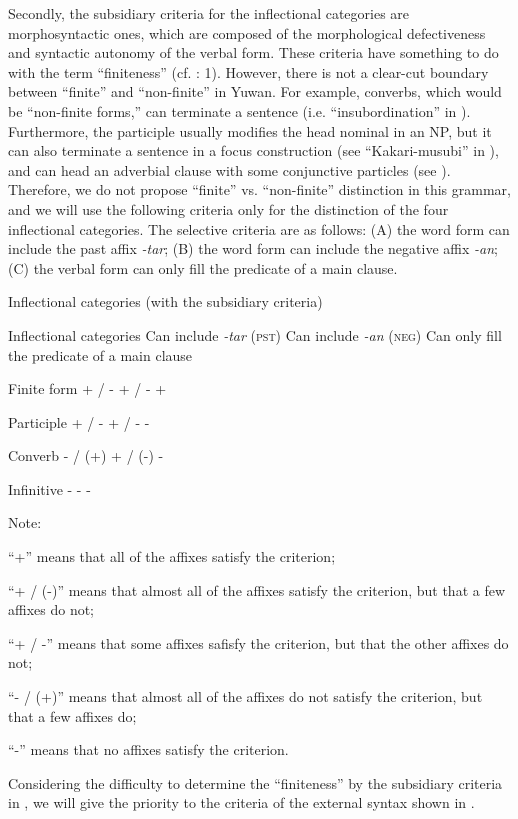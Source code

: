   Secondly, the subsidiary criteria for the inflectional categories are morphosyntactic ones, which are composed of the morphological defectiveness and syntactic autonomy of the verbal form. These criteria have something to do with the term “finiteness” (cf. \citealt{Nikolaeva2007}: 1). However, there is not a clear-cut boundary between “finite” and “non-finite” in Yuwan. For example, converbs, which would be “non-finite forms,” can terminate a sentence (i.e. “insubordination” in ). Furthermore, the participle usually modifies the head nominal in an NP, but it can also terminate a sentence in a focus construction (see “Kakari-musubi” in ), and can head an adverbial clause with some conjunctive particles (see ). Therefore, we do not propose “finite” vs. “non-finite” distinction in this grammar, and we will use the following criteria only for the distinction of the four inflectional categories. The selective criteria are as follows: (A) the word form can include the past affix \textit{-tar}; (B) the word form can include the negative affix \textit{-an}; (C) the verbal form can only fill the predicate of a main clause.

\begin{table}
\caption{\label{tab:key:78}Inflectional categories (with the subsidiary criteria)}

Inflectional categories  Can include \textit{-tar} (\textsc{pst})  Can include \textit{-an} (\textsc{neg})  Can only fill the predicate of a main clause

Finite form  + / -  + / -  +

Participle  + / -  + / -  -

Converb  - / (+)  + / (-)  -

Infinitive  -  -  -

Note:

  “+” means that all of the affixes satisfy the criterion;

“+ / (-)” means that almost all of the affixes satisfy the criterion, but that a few affixes do not;

“+ / -” means that some affixes safisfy the criterion, but that the other affixes do not;

“- / (+)” means that almost all of the affixes do not satisfy the criterion, but that a few affixes do;

“-” means that no affixes satisfy the criterion.
\end{table}

Considering the difficulty to determine the “finiteness” by the subsidiary criteria in , we will give the priority to the criteria of the external syntax shown in .

